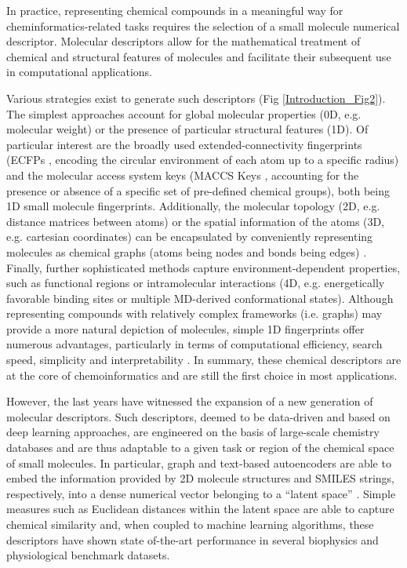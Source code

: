 In practice, representing chemical compounds in a meaningful way for cheminformatics-related tasks requires the selection of a small molecule numerical descriptor. Molecular descriptors allow for the mathematical treatment of chemical and structural features of molecules and facilitate their subsequent use in computational applications. 


Various strategies exist to generate such descriptors (Fig \ref{Introduction_Fig2}). The simplest approaches account for global molecular properties (0D, e.g. molecular weight) or the presence of particular structural features (1D). Of particular interest are the broadly used extended-connectivity fingerprints (ECFPs \cite{rogers_extended-connectivity_2010}, encoding the circular environment of each atom up to a specific radius) and the molecular access system keys (MACCS Keys \cite{durant_reoptimization_2002}, accounting for the presence or absence of a specific set of pre-defined chemical groups), both being 1D small molecule fingerprints. Additionally, the molecular topology (2D, e.g. distance matrices between atoms) or the spatial information of the atoms (3D, e.g. cartesian coordinates) can be encapsulated by conveniently representing molecules as chemical graphs (atoms being nodes and bonds being edges) \cite{devinyak_3d-morse_2014}. Finally, further sophisticated methods capture environment-dependent properties, such as functional regions or intramolecular interactions (4D, e.g. energetically favorable binding sites or multiple MD-derived conformational states)\cite{pastor_grid-independent_2000, riniker_molecular_2017}. Although representing compounds with relatively complex frameworks (i.e. graphs) may provide a more natural depiction of molecules, simple 1D fingerprints offer numerous advantages, particularly in terms of computational efficiency, search speed, simplicity and interpretability \cite{rogers_extended-connectivity_2010}. In summary, these chemical descriptors are at the core of chemoinformatics and are still the first choice in most applications\cite{david_molecular_2020, cereto-massague_molecular_2015}.

However, the last years have witnessed the expansion of a new generation of molecular descriptors. Such descriptors, deemed to be data-driven and based on deep learning approaches, are engineered on the basis of large-scale chemistry databases and are thus adaptable to a given task or region of the chemical space of small molecules\cite{sanchez-lengeling_inverse_2018}. In particular, graph and text-based autoencoders\cite{hinton_reducing_2006, baldi_autoencoders_2012} are able to embed the information provided by 2D molecule structures and SMILES strings, respectively, into a dense numerical vector belonging to a “latent space” \cite{jin_hierarchical_2019, gomez-bombarelli_automatic_2018, liu_constrained_2018, polykovskiy_molecular_2020}. Simple measures such as Euclidean distances within the latent space are able to capture chemical similarity and, when coupled to machine learning algorithms, these descriptors have shown state of-the-art performance in several biophysics and physiological benchmark datasets\cite{wu_moleculenet_2018}.

